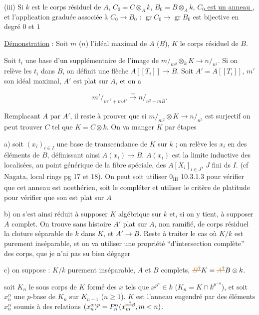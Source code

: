 (iii) Si $k$ est le corps résiduel de $A$, $C_0=C\otimes_A k$, $B_0=B\otimes_A k$, \uline{$C_0$ est un anneau }, et l'application graduée associée à $C_0\longrightarrow B_0$ : $\operatorname{gr}C_0\longrightarrow\operatorname{gr}B_0$ est bijective en degré $0$ et $1$

\uline{Démonstration} : Soit $m$ ($n$) l'idéal maximal de $A$ ($B$), $K$ le corps résiduel de $B$.

Soit $t_i$ une base d'un supplémentaire de l'image de $m/_{m^2}\otimes_k K\longrightarrow n/_{n^2}$. Si on relève les $t_i$ dans $B$, on définit une flèche $A[[T_i]]\longrightarrow B$. Soit $A'=A[[T_i]]$, $m'$ son idéal maximal, $A'$ est plat sur $A$, et on a 

\[
m'/_{m'^2+mA'}\xrightarrow{\sim} n/_{n^2+mB}.
\]


Remplacant $A$ par $A'$, il reste à prouver que si $m/_{m^2}\otimes K\longrightarrow n/_{n^2}$ est surjectif  on peut trouver $C$ tel que $K=C\otimes k$. On va manger $K$ par étapes

a) soit $(x_i)_{i\in I}$ une base de transcendance de $K$ sur $k$ ;  on relève les $x_i$ en des éléments de $B$, définissant ainsi $A(x_i)\longrightarrow B$. $A(x_i)$ est la limite inductive des localisées, au point générique de la fibre spéciale, des $A[X_i]_{i\in J}$, $J$ fini ds $I$. (cf Nagata, local rings pg 17 et 18). On peut soit utiliser $0_{\overline{\underline{\mathrm{III}}}}$ 10.3.1.3 pour vérifier que cet anneau est noethérien, soit le compléter et utiliser le critère de platitude pour vérifier que son  est plat sur $A$

b) on s'est ainsi réduit à supposer $K$ algébrique sur $k$ et, si on y tient, à supposer $A$ complet. On trouve sans histoire $A'$ plat sur $A$, non ramifié, de corps résiduel la cloture séparable de $k$ dans $K$, et $A'\longrightarrow B$. Reste à traiter le cas où $K/k$ est purement inséparable, et on va utiliser une propriété ``d'intersection complète'' des corps, que je n'ai pas su bien dégager

c) on suppose : $K/k$ purement inséparable, $A$ et $B$ complets, $\deleted{\unsure{B}}K=\deleted{\unsure{A}}B\otimes k$.

soit $K_n$ le sous corps de $K$ formé des $x$ tels que $x^{p^n}\in k$ ($K_n=K\cap k^{p^{-n}}$), et soit $x_n^\alpha$ une $p$-base de $K_n$ sur $K_{n-1}$ ($n\geq1$). $K$ est  l'anneau engendré par des éléments $x_n^\alpha$ soumis à des relations $(x_n^\alpha)^p=P_n^\alpha(x_m^{\deleted{\unsure{\alpha}}\beta},m<n)$. 

